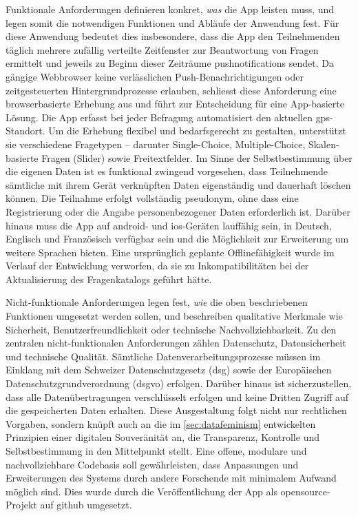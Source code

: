 Funktionale Anforderungen definieren konkret, \textit{was} die App leisten muss, und legen somit die notwendigen Funktionen und Abläufe der Anwendung fest. Für diese Anwendung bedeutet dies insbesondere, dass die App den Teilnehmenden täglich mehrere zufällig verteilte Zeitfenster zur Beantwortung von Fragen ermittelt und jeweils zu Beginn dieser Zeiträume \glspl{pushnotification} sendet. Da gängige Webbrowser keine verlässlichen Push-Benachrichtigungen oder zeitgesteuerten Hintergrundprozesse erlauben, schliesst diese Anforderung eine browserbasierte Erhebung aus und führt zur Entscheidung für eine App-basierte Lösung. Die App erfasst bei jeder Befragung automatisiert den aktuellen \gls{gps}-Standort. Um die Erhebung flexibel und bedarfsgerecht zu gestalten, unterstützt sie verschiedene Fragetypen -- darunter Single-Choice, Multiple-Choice, Skalen-basierte Fragen (Slider) sowie Freitextfelder. Im Sinne der Selbstbestimmung über die eigenen Daten ist es funktional zwingend vorgesehen, dass Teilnehmende sämtliche mit ihrem Gerät verknüpften Daten eigenständig und dauerhaft löschen können. Die Teilnahme erfolgt vollständig pseudonym, ohne dass eine Registrierung oder die Angabe personenbezogener Daten erforderlich ist. Darüber hinaus muss die App auf \gls{android}- und \gls{ios}-Geräten lauffähig sein, in Deutsch, Englisch und Französisch verfügbar sein und die Möglichkeit zur Erweiterung um weitere Sprachen bieten. Eine ursprünglich geplante Offlinefähigkeit wurde im Verlauf der Entwicklung verworfen, da sie zu Inkompatibilitäten bei der Aktualisierung des Fragenkatalogs geführt hätte.

Nicht-funktionale Anforderungen legen fest, \textit{wie} die oben beschriebenen Funktionen umgesetzt werden sollen, und beschreiben qualitative Merkmale wie Sicherheit, Benutzerfreundlichkeit oder technische Nachvollziehbarkeit. Zu den zentralen nicht-funktionalen Anforderungen zählen Datenschutz, Datensicherheit und technische Qualität. Sämtliche Datenverarbeitungsprozesse müssen im Einklang mit dem Schweizer Datenschutzgesetz (\acrshort{dsg}) sowie der Europäischen Datenschutzgrundverordnung (\acrshort{dsgvo}) erfolgen. Darüber hinaus ist sicherzustellen, dass alle Datenübertragungen verschlüsselt erfolgen und keine Dritten Zugriff auf die gespeicherten Daten erhalten. Diese Ausgestaltung folgt nicht nur rechtlichen Vorgaben, sondern knüpft auch an die im \cref{sec:datafeminism} entwickelten Prinzipien einer digitalen Souveränität an, die Transparenz, Kontrolle und Selbstbestimmung in den Mittelpunkt stellt. Eine offene, modulare und nachvollziehbare Codebasis soll gewährleisten, dass Anpassungen und Erweiterungen des Systems durch andere Forschende mit minimalem Aufwand möglich sind. Dies wurde durch die Veröffentlichung der App als \gls{opensource}-Projekt auf \gls{github} umgesetzt.

